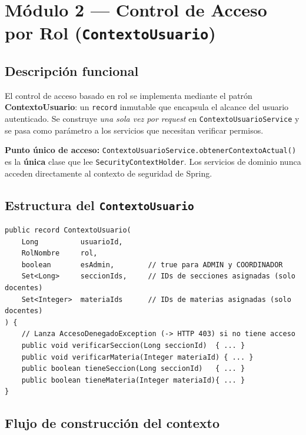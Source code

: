 \documentclass[11pt,a4paper,oneside]{article}
\newcommand{\code}[1]{\texttt{\small #1}}
\begin{document}
\section{Módulo 2 — Control de Acceso por Rol (\code{ContextoUsuario})}

\subsection{Descripción funcional}

El control de acceso basado en rol se implementa mediante el patrón \textbf{ContextoUsuario}:
un \code{record} inmutable que encapsula el alcance del usuario autenticado. Se construye
\emph{una sola vez por request} en \code{ContextoUsuarioService} y se pasa como parámetro a
los servicios que necesitan verificar permisos.

\begin{ataraInfo}
\textbf{Punto único de acceso:} \code{ContextoUsuarioService.obtenerContextoActual()} es la
\textbf{única} clase que lee \code{SecurityContextHolder}. Los servicios de dominio nunca
acceden directamente al contexto de seguridad de Spring.
\end{ataraInfo}

\subsection{Estructura del \code{ContextoUsuario}}

\begin{lstlisting}[style=java,caption={\code{ContextoUsuario.java} — \emph{record} inmutable por request}]
public record ContextoUsuario(
    Long          usuarioId,
    RolNombre     rol,
    boolean       esAdmin,        // true para ADMIN y COORDINADOR
    Set<Long>     seccionIds,     // IDs de secciones asignadas (solo docentes)
    Set<Integer>  materiaIds      // IDs de materias asignadas (solo docentes)
) {
    // Lanza AccesoDenegadoException (-> HTTP 403) si no tiene acceso
    public void verificarSeccion(Long seccionId)  { ... }
    public void verificarMateria(Integer materiaId) { ... }
    public boolean tieneSeccion(Long seccionId)   { ... }
    public boolean tieneMateria(Integer materiaId){ ... }
}
\end{lstlisting}

\subsection{Flujo de construcción del contexto}
\end{document}
